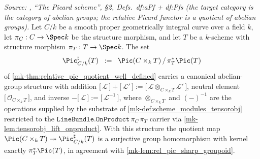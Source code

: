 \begin{theorem}\label{mk-thm:rel_pic_addcommgroup_via_tensorobj}
  \leanok

  \textit{Source: \cite{kleiman-picard}, ``The Picard scheme'', \S 2,
  Defs.~df:aPf + df:Pfs (the target category is the category of abelian
  groups; the relative Picard functor is a quotient of abelian groups).}
  Let \(C/k\) be a smooth proper geometrically integral curve over a
  field \(k\), let \(\pi_C : C \to \Spec k\) be the structure morphism,
  and let \(T\) be a \(k\)-scheme with structure morphism
  \(\pi_T : T \to \Spec k\). The set
  \[
    \Pic^{\sharp}_{C/k}(T) \;\;:=\;\; \Pic(C \times_k T) \,/\, \pi_T^*\Pic(T)
  \]
  of \ref{mk-thm:relative_pic_quotient_well_defined} carries a canonical
  abelian-group structure with addition
  \(\bigl[\,\mathcal{L}\,\bigr] + \bigl[\,\mathcal{L}'\,\bigr]
   := \bigl[\,\mathcal{L} \otimes_{C \times_k T} \mathcal{L}'\,\bigr]\),
  neutral element \(\bigl[\,\mathcal{O}_{C \times_k T}\,\bigr]\), and
  inverse
  \(-\bigl[\,\mathcal{L}\,\bigr] := \bigl[\,\mathcal{L}^{-1}\,\bigr]\),
  where \(\otimes_{C \times_k T}\) and \((-)^{-1}\) are the operations
  supplied by the substrate of \ref{mk-def:scheme_modules_tensorobj}
  restricted to the \(\texttt{LineBundle.OnProduct}\,\pi_C\,\pi_T\) carrier
  via \ref{mk-lem:tensorobj_lift_onproduct}. With this structure the quotient
  map
  \(\Pic(C \times_k T) \twoheadrightarrow \Pic^{\sharp}_{C/k}(T)\) is a
  surjective group homomorphism with kernel exactly \(\pi_T^*\Pic(T)\),
  in agreement with \ref{mk-lem:rel_pic_sharp_groupoid}.
\end{theorem}

